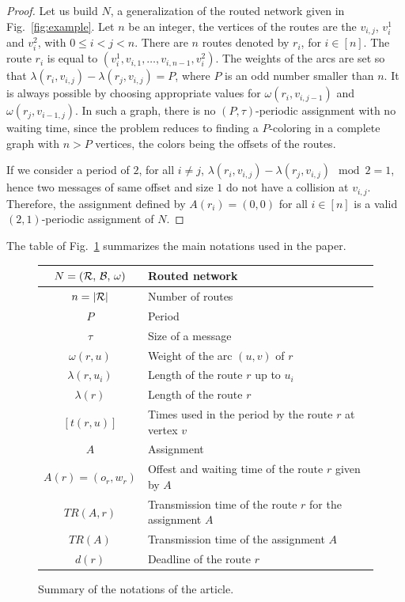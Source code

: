 \documentclass[a4paper,10pt]{article}
\begin{document}
	\begin{proof}
      Let us build $N$, a generalization of the routed network given in Fig.~\ref{fig:example}. 
      Let $n$ be an integer, the vertices of the routes are the $v_{i,j}$, $v_i^1$ and $v_i^2$, with $0 \leq i < j <n$. 
      There are $n$ routes denoted by $r_i$, for $i \in [n]$. The route $r_i$ is equal to $(v_i^1,v_{i,1},\dots,v_{i,n-1},v_i^2)$. The weights of the arcs are set so that $\lambda(r_i, v_{i,j}) - \lambda(r_j,v_{i,j})= P$, where $P$ is an odd number smaller than $n$. It is always possible by choosing appropriate values for $\omega(r_i,v_{i,j-1})$ and $\omega(r_j,v_{i-1,j})$. In such a graph, there is no $(P,\tau)$-periodic assignment with no waiting time, since the problem reduces to finding a $P$-coloring in a complete graph with $n > P$ vertices, the colors being the offsets of the routes.

      If we consider a period of $2$, for all $i \neq j$, $\lambda(r_i, v_{i,j}) - \lambda(r_j, v_{i,j}) \mod 2 = 1$, hence two messages of same offset and size $1$ do not have a collision at $v_{i,j}$. Therefore, the assignment defined by $A(r_i) = (0,0)$ for all $i \in [n]$ is a valid $(2,1)$-periodic assignment of $N$.      
\end{proof}


      The table of Fig.~\ref{tab:summary} summarizes the main notations used in the paper.
      \begin{figure}\label{tab:summary}
      \begin{center}
   \begin{tabularx}{\textwidth}{|c|X|}
    \hline
     $N = (\cal{R},\,\cal{B},\,\omega)$ & Routed network \\
     \hline
     $n = |\cal{R}|$ & Number of routes\\
     \hline
     $P$ & Period\\
     \hline
     $\tau$ & Size of a message\\
     \hline
     $\omega(r,u)$ & Weight of the arc $(u,v)$ of $r$ \\
     \hline
     $\lambda(r,u_i)$ & Length of the route $r$ up to $u_i$\\
     \hline
     $\lambda(r)$ & Length of the route $r$\\
     \hline
     $ [t(r,u)]$& Times used in the period by the route $r$ at vertex $v$\\
     \hline 
     $A$ & Assignment\\
     \hline 
     $A(r) = (o_r,w_r)$ & Offest and waiting time of the route $r$ given by $A$ \\
     \hline 
     $TR(A,r)$& Transmission time of the route $r$ for the assignment $A$\\
     \hline 
     $TR(A)$& Transmission time of the assignment $A$\\
     \hline
     $d(r)$ & Deadline of the route $r$\\
     \hline

      \end{tabularx}
      \end{center}
      \caption{Summary of the notations of the article.}
      \end{figure}
  	
\end{document}
